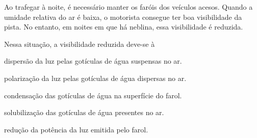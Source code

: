 Ao trafegar à noite, é necessário manter os faróis dos veículos acesos. Quando a umidade relativa do ar é baixa, o motorista consegue ter boa visibilidade da pista. No entanto, em noites em que há neblina, essa visibilidade é reduzida.\par
Nessa situação, a visibilidade reduzida deve-se à\par
\begin{alternativas}
  \item dispersão da luz pelas gotículas de água suspensas no ar.
  \item polarização da luz pelas gotículas de água dispersas no ar.
  \item condensação das gotículas de água na superfície do farol.
  \item solubilização das gotículas de água presentes no ar.
  \item redução da potência da luz emitida pelo farol.
\end{alternativas}
